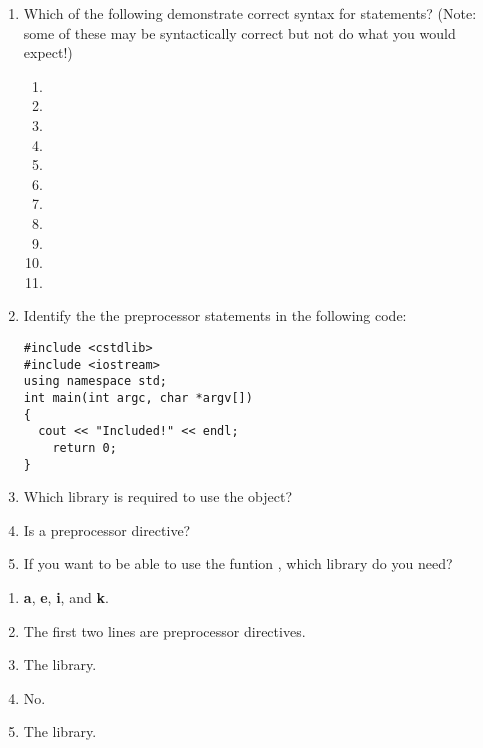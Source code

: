 \begin{enumerate}
	\item Which of the following demonstrate correct syntax for  statements? (Note: some of these may be syntactically correct but not do what you would expect!)
	
	\begin{enumerate}
		\item {}
		\item {}
		\item {}
		\item {}
		\item {}
		\item {}
		\item {}
		\item {}
		\item {}
		\item {}
		\item {}
	\end{enumerate}
 
	\item Identify the the preprocessor statements in the following code: \nopagebreak[4]

\noindent\begin{minipage}{\linewidth}\begin{lstlisting}
#include <cstdlib>
#include <iostream>
using namespace std;
int main(int argc, char *argv[])
{
  cout << "Included!" << endl;
	return 0;
}
\end{lstlisting}\end{minipage}

  \item Which library is required to use the  object?
 
	\item Is  a preprocessor directive?
 
	\item If you want to be able to use the funtion , which library do you need?

\end{enumerate}


\begin{enumerate}
	\item \textbf{a}, \textbf{e}, \textbf{i}, and \textbf{k}.
	\item The first two lines are preprocessor directives.
	\item The  library.
	\item No.
	\item The  library.
\end{enumerate}





